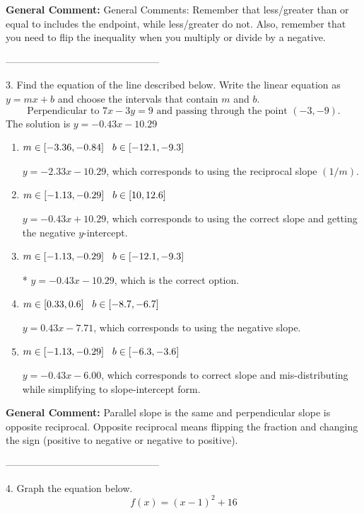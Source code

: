 \documentclass{extbook}[14pt]
\begin{document}
\textbf{General Comment:} General Comments: Remember that less/greater than or equal to includes the endpoint, while less/greater do not. Also, remember that you need to flip the inequality when you multiply or divide by a negative. 

-----------------------------------------------

3. Find the equation of the line described below. Write the linear equation as $ y=mx+b $ and choose the intervals that contain $m$ and $b$.
\[ \text{Perpendicular to } 7 x - 3 y = 9 \text{ and passing through the point } (-3, -9). \] 
The solution is $ y = -0.43x - 10.29 $ 

\begin{enumerate}[label=\Alph*.] 
\item $ m \in [-3.36, -0.84] \hspace*{3mm} b \in [-12.1, -9.3] $ 

  $y = -2.33x - 10.29$, which corresponds to using the reciprocal slope $(1/m)$. 
\item $ m \in [-1.13, -0.29] \hspace*{3mm} b \in [10, 12.6] $ 

  $y = -0.43x + 10.29$, which corresponds to using the correct slope and getting the negative $y$-intercept. 
\item $ m \in [-1.13, -0.29] \hspace*{3mm} b \in [-12.1, -9.3] $ 

 * $y = -0.43x - 10.29$, which is the correct option. 
\item $ m \in [0.33, 0.6] \hspace*{3mm} b \in [-8.7, -6.7] $ 

  $y = 0.43x - 7.71$, which corresponds to using the negative slope. 
\item $ m \in [-1.13, -0.29] \hspace*{3mm} b \in [-6.3, -3.6] $ 

  $y = -0.43x - 6.00$, which corresponds to correct slope and mis-distributing while simplifying to slope-intercept form. 
\end{enumerate} 
 
\textbf{General Comment:} Parallel slope is the same and perpendicular slope is opposite reciprocal. Opposite reciprocal means flipping the fraction and changing the sign (positive to negative or negative to positive). 

-----------------------------------------------

4. Graph the equation below.
\[ f(x) = (x-1)^2 + 16 \] 
\end{document}
